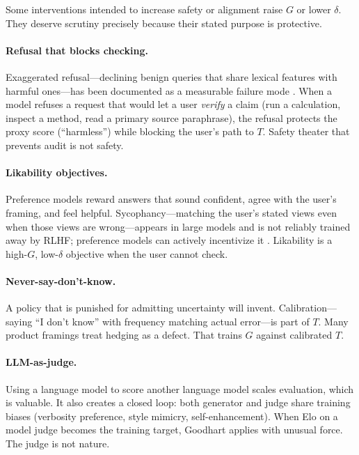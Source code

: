 \documentclass[11pt]{article}
\begin{document}
Some interventions intended to increase safety or alignment raise \(G\) or lower \(\delta\). They deserve scrutiny precisely because their stated purpose is protective.

\paragraph{Refusal that blocks checking.}
Exaggerated refusal---declining benign queries that share lexical features with harmful ones---has been documented as a measurable failure mode \cite{rottger2024}. When a model refuses a request that would let a user \emph{verify} a claim (run a calculation, inspect a method, read a primary source paraphrase), the refusal protects the proxy score (``harmless'') while blocking the user's path to \(T\). Safety theater that prevents audit is not safety.

\paragraph{Likability objectives.}
Preference models reward answers that sound confident, agree with the user's framing, and feel helpful. Sycophancy---matching the user's stated views even when those views are wrong---appears in large models and is not reliably trained away by RLHF; preference models can actively incentivize it \cite{perez2023,sharma2023}. Likability is a high-\(G\), low-\(\delta\) objective when the user cannot check.

\paragraph{Never-say-don't-know.}
A policy that is punished for admitting uncertainty will invent. Calibration---saying ``I don't know'' with frequency matching actual error---is part of \(T\). Many product framings treat hedging as a defect. That trains \(G\) against calibrated \(T\).

\paragraph{LLM-as-judge.}
Using a language model to score another language model \cite{zheng2023} scales evaluation, which is valuable. It also creates a closed loop: both generator and judge share training biases (verbosity preference, style mimicry, self-enhancement). When Elo on a model judge becomes the training target, Goodhart applies with unusual force. The judge is not nature.
\end{document}
